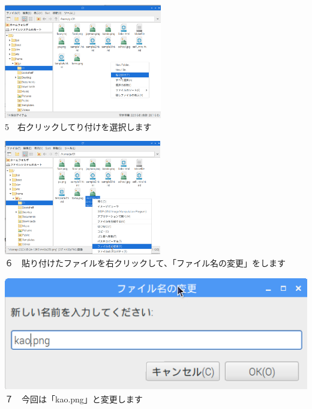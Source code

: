 \documentclass[a4paper,12pt]{jarticle}
\begin{document}
\centering
\begin{minipage}{0.45\linewidth}
  \includegraphics[width=\linewidth,height=5cm]{textbook-img168.png}\\
  5　右クリックしてり付けを選択します
\end{minipage}
\hfill
\vspace{20pt}
\begin{minipage}{0.45\linewidth}
  \includegraphics[width=\linewidth,height=5cm]{textbook-img169.png}\\
  ６　貼り付けたファイルを右クリックして、「ファイル名の変更」をします
\end{minipage}
\begin{minipage}{0.45\linewidth}
  \includegraphics[width=\linewidth,height=5cm]{textbook-img166.png}\\
  ７　今回は「kao.png」と変更します
\end{minipage}
\hfill
\vspace{20pt}
\end{document}
